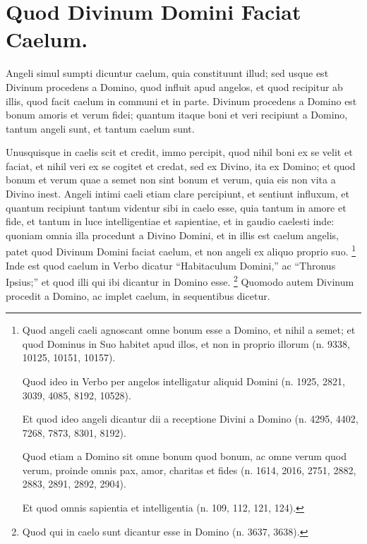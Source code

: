 \chapter{Quod Divinum Domini Faciat Caelum.}

\begin{topic}{7}
    Angeli simul sumpti dicuntur caelum, quia constituunt illud; sed usque est Divinum procedens a Domino, quod influit
    apud angelos, et quod recipitur ab illis, quod facit caelum in communi et in parte.
    Divinum procedens a Domino est bonum amoris et verum fidei; quantum itaque boni et veri recipiunt a Domino, tantum
    angeli sunt, et tantum caelum sunt.
\end{topic}

\begin{topic}{8}
    Unusquisque in caelis scit et credit, immo percipit, quod nihil boni ex se velit et faciat, et nihil veri ex se
    cogitet et credat, sed ex Divino, ita ex Domino; et quod bonum et verum quae a semet non sint bonum et verum, quia
    eis non vita a Divino inest.
    Angeli intimi caeli etiam clare percipiunt, et sentiunt influxum, et quantum recipiunt tantum videntur sibi in caelo
    esse, quia tantum in amore et fide, et tantum in luce intelligentiae et sapientiae, et in gaudio caelesti inde:
    quoniam omnia illa procedunt a Divino Domini, et in illis est caelum angelis, patet quod Divinum Domini faciat
    caelum, et non angeli ex aliquo proprio suo.
    \footnote{
        Quod angeli caeli agnoscant omne bonum esse a Domino, et nihil a semet; et quod Dominus in Suo habitet apud
        illos, et non in proprio illorum (n. 9338, 10125, 10151, 10157).

        Quod ideo in Verbo per angelos intelligatur aliquid Domini (n. 1925, 2821, 3039, 4085, 8192, 10528).

        Et quod ideo angeli dicantur dii a receptione Divini a Domino (n. 4295, 4402, 7268, 7873, 8301, 8192).

        Quod etiam a Domino sit omne bonum quod bonum, ac omne verum quod verum, proinde omnis pax, amor, charitas et
        fides (n. 1614, 2016, 2751, 2882, 2883, 2891, 2892, 2904).

        Et quod omnis sapientia et intelligentia (n. 109, 112, 121, 124).
    }
    Inde est quod caelum in Verbo dicatur ``Habitaculum Domini,'' ac ``Thronus Ipsius;'' et quod illi qui ibi dicantur
    in Domino esse.
    \footnote{
        Quod qui in caelo sunt dicantur esse in Domino (n. 3637, 3638).
    }
    Quomodo autem Divinum procedit a Domino, ac implet caelum, in sequentibus dicetur.
\end{topic}

